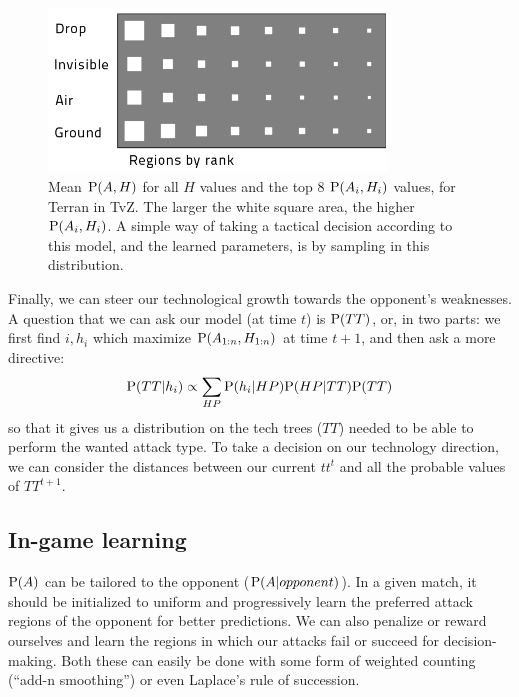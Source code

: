 \begin{figure}[!h]
\centerline{\includegraphics[width=9cm]{images/WhereHow_T_TvZ_light.png}}
\caption{Mean $\mathrm{P}(A,H)$ for all $H$ values and the top 8 $\mathrm{P}(A_i,H_i)$ values, for Terran in TvZ. The larger the white square area, the higher $\mathrm{P}(A_i,H_i)$. A simple way of taking a tactical decision according to this model, and the learned parameters, is by sampling in this distribution.}
\label{fig:WhereHow}
\end{figure}

Finally, we can steer our technological growth towards the opponent's weaknesses. A question that we can ask our model (at time $t$) is $\mathrm{P}(TT)$, or, in two parts: we first find $i,h_i$ which maximize $\mathrm{P}(A_{1:n},H_{1:n})$ at time $t+1$, and then ask a more directive:
$$\mathrm{P}(TT|h_i) \propto \sum_{HP} \mathrm{P}(h_i|HP)\mathrm{P}(HP|TT)\mathrm{P}(TT)$$
so that it gives us a distribution on the tech trees ($TT$) needed to be able to perform the wanted attack type. To take a decision on our technology direction, we can consider the distances between our current $tt^t$ and all the probable values of $TT^{t+1}$.

\subsection{In-game learning}
$\mathrm{P}(A)$ can be tailored to the opponent ($\mathrm{P}(A|opponent)$). In a given match, it should be initialized to uniform and progressively learn the preferred attack regions of the opponent for better predictions. We can also penalize or reward ourselves and learn the regions in which our attacks fail or succeed for decision-making. Both these can easily be done with some form of weighted counting (``add-n smoothing'') or even Laplace's rule of succession.

